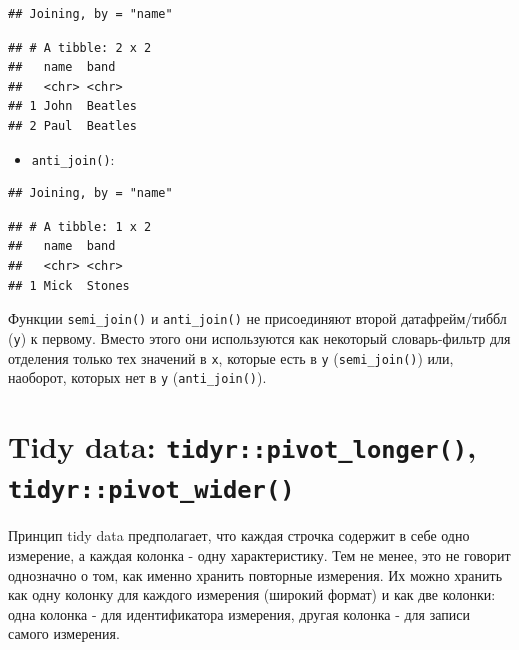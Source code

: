 \documentclass[
]{book}
\newenvironment{Shaded}{\begin{snugshade}}{\end{snugshade}}
\newcommand{\KeywordTok}[1]{\textcolor[rgb]{0.13,0.29,0.53}{\textbf{#1}}}
\newcommand{\NormalTok}[1]{#1}
\newcommand{\OperatorTok}[1]{\textcolor[rgb]{0.81,0.36,0.00}{\textbf{#1}}}
\newcommand{\StringTok}[1]{\textcolor[rgb]{0.31,0.60,0.02}{#1}}
\providecommand{\tightlist}{%
  \setlength{\itemsep}{0pt}\setlength{\parskip}{0pt}}
\begin{document}
\begin{verbatim}
## Joining, by = "name"
\end{verbatim}

\begin{verbatim}
## # A tibble: 2 x 2
##   name  band   
##   <chr> <chr>  
## 1 John  Beatles
## 2 Paul  Beatles
\end{verbatim}

\begin{itemize}
\tightlist
\item
  \texttt{anti\_join()}:
\end{itemize}

\begin{Shaded}
\end{Shaded}

\begin{verbatim}
## Joining, by = "name"
\end{verbatim}

\begin{verbatim}
## # A tibble: 1 x 2
##   name  band  
##   <chr> <chr> 
## 1 Mick  Stones
\end{verbatim}

Функции \texttt{semi\_join()} и \texttt{anti\_join()} не присоединяют второй датафрейм/тиббл (\texttt{y}) к первому. Вместо этого они используются как некоторый словарь-фильтр для отделения только тех значений в \texttt{x}, которые есть в \texttt{y} (\texttt{semi\_join()}) или, наоборот, которых нет в \texttt{y} (\texttt{anti\_join()}).

\hypertarget{tidy_data}{%
\section{\texorpdfstring{Tidy data: \texttt{tidyr::pivot\_longer()}, \texttt{tidyr::pivot\_wider()}}{Tidy data: tidyr::pivot\_longer(), tidyr::pivot\_wider()}}\label{tidy_data}}

Принцип tidy data предполагает, что каждая строчка содержит в себе одно измерение, а каждая колонка - одну характеристику. Тем не менее, это не говорит однозначно о том, как именно хранить повторные измерения. Их можно хранить как одну колонку для каждого измерения (широкий формат) и как две колонки: одна колонка - для идентификатора измерения, другая колонка - для записи самого измерения.
\end{document}
